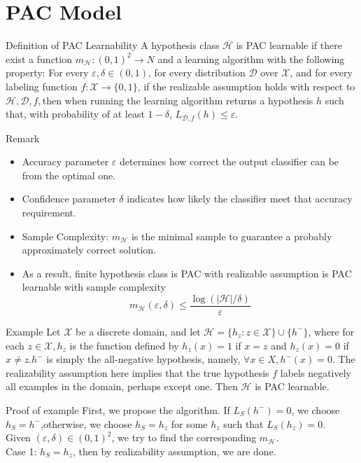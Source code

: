 \documentclass{beamer}
\begin{document}
\section{PAC Model}
\begin{frame}{Definition of PAC Learnability}
	A hypothesis class $\mathcal{H}$ is PAC learnable if there exist a function $m_{\mathcal{H}}: (0,1)^2 \rightarrow N$ and a learning algorithm with the following property: For every $\varepsilon, \delta \in (0,1)$, for every distribution $\mathcal{D}$ over $\mathcal{X}$, and for every labeling function $f: \mathcal{X} \rightarrow \{0,1\}$, if the realizable assumption holds with respect to $\mathcal{H},\mathcal{D},f,$then when running the learning algorithm returns a hypothesis $h$ such that, with probability of at least $1-\delta$, $L_{\mathcal{D},f}(h) \leq \varepsilon$. \\
\end{frame}
\begin{frame}{Remark}
	\begin{itemize}
	\item Accuracy parameter $\varepsilon$ determines how correct the output classifier can be from the optimal one.
	\item Confidence parameter $\delta$ indicates how likely the classifier meet that accuracy requirement.
	\item Sample Complexity: $m_{\mathcal{H}}$ is the minimal sample to guarantee a probably approximately correct solution.
	\item As a result, finite hypothesis class is PAC with realizable assumption is PAC learnable with sample complexity 
		\[m_{\mathcal{H}}(\varepsilon,\delta) \leq \frac{\log(|\mathcal{H}|/\delta)}{\varepsilon}\]
	\end{itemize}
\end{frame}
\begin{frame}{Example}
	Let $\mathcal{X}$ be a discrete domain, and let $\mathcal{H}=\{h_z:z \in \mathcal{X}\} \cup \{h^{-}\}$, where for each $z \in \mathcal{X},h_z$ is the function defined by $h_z(x)=1$ if $x=z$ and $h_z(x)=0$ if $x \neq z. h^{-}$ is simply the all-negative hypothesis, namely, $\forall x \in X,h^{-}(x)=0$. The realizability assumption here implies that the true hypothesis $f$ labels negatively all examples in the domain, perhaps except one. Then $\mathcal{H}$ is PAC learnable.
\end{frame}
\begin{frame}{Proof of example}
	First, we propose the algorithm. If $L_S(h^{-})=0$, we  choose $h_S = h^{-}$,otherwise, we choose $h_S = h_z$ for some $h_z$ such that $L_S(h_z)=0$. \\
	Given $(\varepsilon,\delta) \in (0,1)^2$, we try to find the corresponding $m_{\mathcal{H}}$. \\ 
	Case 1: $h_S = h_z$, then by realizability assumption, we are done. \\
\end{frame}
\end{document}
